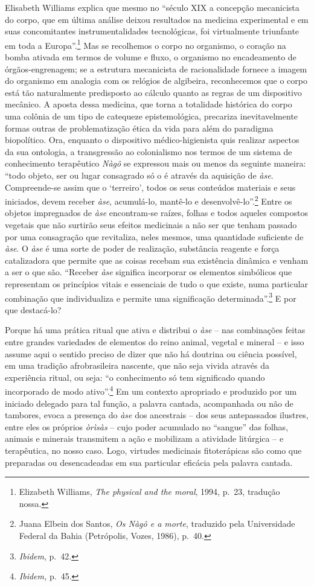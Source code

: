 Elisabeth Williams explica que mesmo no ``século XIX a concepção
mecanicista do corpo, que em última análise deixou resultados na
medicina experimental e em suas concomitantes instrumentalidades
tecnológicas, foi virtualmente triunfante em toda a Europa''.\footnote{Elizabeth
  Williams, \emph{The physical and the moral}, 1994, p.~23, tradução
  nossa.} Mas se recolhemos o corpo no organismo, o coração na bomba
ativada em termos de volume e fluxo, o organismo no encadeamento de
órgãos-engrenagem; se a estrutura mecanicista de racionalidade fornece a
imagem do organismo em analogia com os relógios de algibeira,
reconhecemos que o corpo está tão naturalmente predisposto ao cálculo
quanto as regras de um dispositivo mecânico. A aposta dessa medicina,
que torna a totalidade histórica do corpo uma colônia de um tipo de
catequeze epistemológica, precariza inevitavelmente formas outras de
problematização ética da vida para além do paradigma biopolítico. Ora,
enquanto o dispositivo médico-higienista quis realizar aspectos da sua
ontologia, a transgressão ao colonialismo nos termos de um sistema de
conhecimento terapêutico \emph{Nàgô} se expressou mais ou menos da
seguinte maneira: ``todo objeto, ser ou lugar consagrado só o é através
da aquisição de \emph{àse}. Compreende-se assim que o `terreiro', todos
os seus conteúdos materiais e seus iniciados, devem receber \emph{àse},
acumulá-lo, mantê-lo e desenvolvê-lo''.\footnote{Juana Elbein dos
  Santos, \emph{Os Nàgô e a morte}, traduzido pela Universidade Federal
  da Bahia (Petrópolis, Vozes, 1986), p.~40.} Entre os objetos
impregnados de \emph{àse} encontram-se raízes, folhas e todos aqueles
compostos vegetais que não surtirão seus efeitos medicinais a não ser
que tenham passado por uma consagração que revitaliza, neles mesmos, uma
quantidade suficiente de \emph{àse}. O \emph{àse} é uma sorte de poder
de realização, substância reagente e força catalizadora que permite que
as coisas recebam sua existência dinâmica e venham a ser o que são.
``Receber \emph{àse} significa incorporar os elementos simbólicos que
representam os princípios vitais e essenciais de tudo o que existe, numa
particular combinação que individualiza e permite uma significação
determinada''.\footnote{\emph{Ibidem}, p.~42.} E por que destacá-lo?

Porque há uma prática ritual que ativa e distribui o \emph{àse} -- nas
combinações feitas entre grandes variedades de elementos do reino
animal, vegetal e mineral -- e isso assume aqui o sentido preciso de
dizer que não há doutrina ou ciência possível, em uma tradição
afrobrasileira nascente, que não seja vivida através da experiência
ritual, ou seja: ``o conhecimento só tem significado quando incorporado
de modo ativo''.\footnote{\emph{Ibidem,} p.~45.} Em um contexto
apropriado e produzido por um iniciado delegado para tal função, a
palavra cantada, acompanhada ou não de tambores, evoca a presença do
\emph{àse} dos ancestrais -- dos seus antepassados ilustres, entre eles
os próprios \emph{òrìsàs} -- cujo poder acumulado no ``sangue'' das
folhas, animais e minerais transmitem a ação e mobilizam a atividade
litúrgica -- e terapêutica, no nosso caso. Logo, virtudes medicinais
fitoterápicas são como que preparadas ou desencadeadas em sua particular
eficácia pela palavra cantada.

